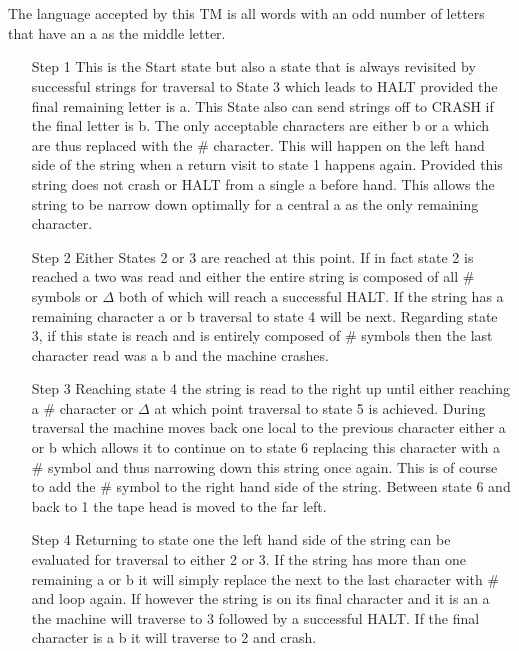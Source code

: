 \documentclass[12pt]{article}
\begin{document}
\section{}
The language accepted by this TM is all words with an odd number of letters that have an a as
the middle letter.

\begin{enumerate}
\item[Step 1] This is the Start state but also a state that is always revisited by successful strings for traversal to State 3 which leads to HALT provided the final remaining letter is a. This State also can send strings off to CRASH if the final letter is b. The only acceptable characters are either b or a which are thus replaced with the \# character. This will happen on the left hand side of the string when a return visit to state 1 happens again. Provided this string does not crash or HALT from a single a before hand. This allows the string to be narrow down optimally for a central a as the only remaining character.
\item [Step 2] Either States 2 or 3 are reached at this point. If in fact state 2 is reached a two was read and either the entire string is composed of all \# symbols or $\Delta$ both of which will reach a successful HALT. If the string has a remaining character a or b traversal to state 4 will be next. Regarding state 3, if this state is reach and is entirely composed of \# symbols then the last character read was a b and the machine crashes. 
\item[Step 3] Reaching state 4 the string is read to the right up until either reaching a \# character or $\Delta$ at which point traversal to state 5 is achieved. During traversal the machine moves back one local to the previous character either a or b which allows it to continue on to state 6  replacing this character with a \# symbol and thus narrowing down this string once again. This is of course to add the \# symbol to the right hand side of the string. Between state 6 and back to 1 the tape head is moved to the far left.
\item[Step 4] 
Returning to state one the left hand side of the string can be evaluated for traversal to either 2 or 3. If the string has more than one remaining a or b it will simply replace the next to the last character with \# and loop again. If however the string is on its final character and it is an a the machine will traverse to 3 followed by a successful HALT. If the final character is a b it will traverse to 2 and crash.
\end{enumerate}
\clearpage
\end{document}
